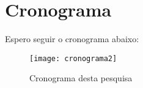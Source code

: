\chapter{Cronograma}
\label{cap:cronograma}

Espero seguir o cronograma abaixo:

\begin{figure}[h!]
  \centering
  \texttt{[image: cronograma2]}
  \caption{Cronograma desta pesquisa}
  \label{fig:cronograma}
\end{figure}
